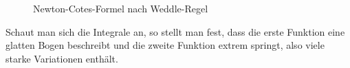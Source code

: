 \documentclass[11pt,a4paper,ngerman]{article}
\begin{document}
\begin{description}
\begin{figure}[ht]
\centering
{}
\caption{Newton-Cotes-Formel nach Weddle-Regel}
\end{figure}
\newpage
Schaut man sich die Integrale an, so stellt man fest, dass die erste Funktion eine glatten Bogen beschreibt und die zweite Funktion extrem springt, also viele starke Variationen enthält.


\end{description}
\end{document}
